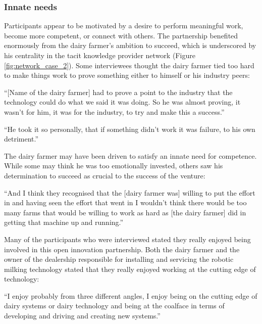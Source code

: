 \subsubsection{Innate needs}

Participants appear to be motivated by a desire to perform meaningful work, become more competent, or connect with others. The partnership benefited enormously from the dairy farmer's ambition to succeed, which is underscored by his centrality in the tacit knowledge provider network (Figure \ref{fig:network_case_2}). Some interviewees thought the dairy farmer tied too hard to make things work to prove something either to himself or his industry peers:

\begin{displayquote}[Participant 9/2]
\small
\enquote{[Name of the dairy farmer] had to prove a point to the industry that the technology could do what we said it was doing. So he was almost proving, it wasn't for him, it was for the industry, to try and make this a success.}
\end{displayquote}


\begin{displayquote}[Participant 15/2]
\small
\enquote{He took it so personally, that if something didn't work it was failure, to his own detriment.}
\end{displayquote}


The dairy farmer may have been driven to satisfy an innate need for competence. While some may think he was too emotionally invested, others saw his determination to succeed as crucial to the success of the venture:

\begin{displayquote}[Participant 11/2]
\small
\enquote{And I think they recognised that the [dairy farmer was] willing to put the effort in and having seen the effort that went in I wouldn't think there would be too many farms that would be willing to work as hard as [the dairy farmer] did in getting that machine up and running.} 
\end{displayquote}


Many of the participants who were interviewed stated they really enjoyed being involved in this open innovation partnership. Both the dairy farmer and the owner of the dealership responsible for installing and servicing the robotic milking technology stated that they really enjoyed working at the cutting edge of technology:

\begin{displayquote}[Participant 1/2]
\small
\enquote{I enjoy probably from three different angles, I enjoy being on the cutting edge of dairy systems or dairy technology and being at the coalface in terms of developing and driving and creating new systems.}
\end{displayquote}



